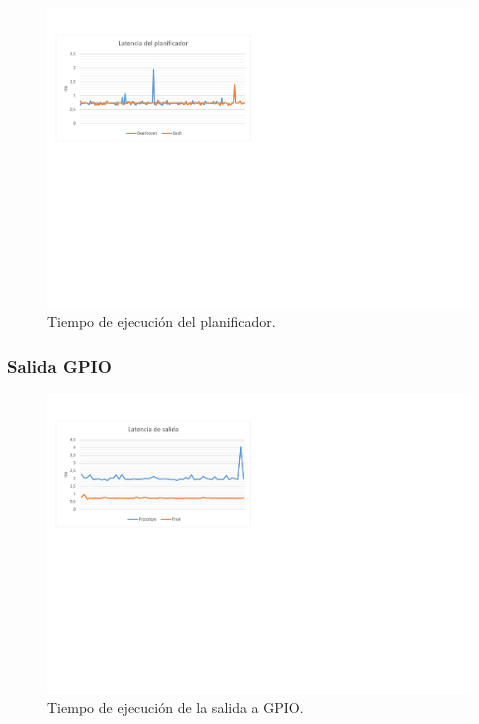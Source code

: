 \begin{figure}[H]
	\noindent \begin{centering}
		\includegraphics[width=\linewidth*3/4]{capitulo6/lat_sched}
		\par\end{centering}
	\smallskip
	\caption{\label{fig:lat_sched} Tiempo de ejecución del planificador.}
\end{figure} 

\smallskip

\subsubsection{Salida GPIO}

\smallskip

\begin{figure}[H]
	\noindent \begin{centering}
		\includegraphics[width=\linewidth*3/4]{capitulo6/lat_gpio}
		\par\end{centering}
	\smallskip
	\caption{\label{fig:lat_gpio} Tiempo de ejecución de la salida a GPIO.}
\end{figure} 

